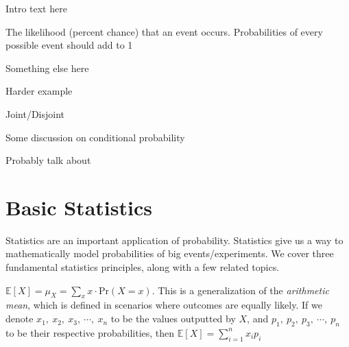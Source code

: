 \documentclass[main.tex]{subfiles}
\begin{document}
Intro text here

\begin{defn}
	The likelihood (percent chance) that an event occurs. Probabilities of every possible event should add to 1
\end{defn}

\begin{example}
	
\end{example}

Something else here

\begin{example}
	Harder example
\end{example}

Joint/Disjoint

\begin{defn}
	
\end{defn}

\begin{defn}
	
\end{defn}

Some discussion on conditional probability

\begin{defn}
	
\end{defn}

\begin{defn}
	
\end{defn}

Probably talk about 

\section{Basic Statistics}

Statistics are an important application of probability. Statistics give us a way to mathematically model probabilities of big events/experiments. We cover three fundamental statistics principles, along with a few related topics.

\begin{defn}
	\(\mathbb{E}[X] = \mu_X = \sum_{x}^{} x \cdot \mathrm{Pr}(X = x)\). This is a generalization of the \textit{arithmetic mean}, which is defined in scenarios where outcomes are equally likely. If we denote \(x_1,\ x_2,\ x_3,\ \cdots,\ x_n\) to be the values outputted by \(X\), and \(p_1,\ p_2,\ p_3,\ \cdots,\ p_n\) to be their respective probabilities, then \(\mathbb{E}[X] = \sum_{i=1}^{n} x_i p_i\)
\end{defn}
\end{document}

